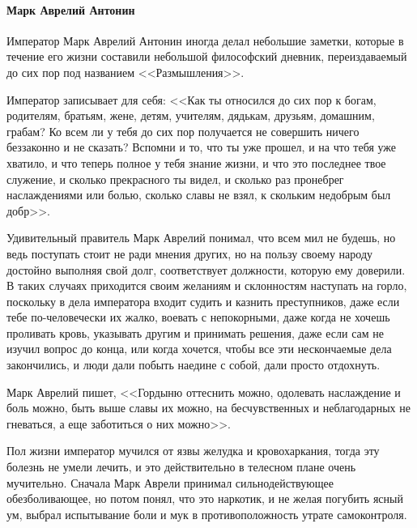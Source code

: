 \paragraph{Марк Аврелий Антонин}

Император Марк Аврелий Антонин иногда делал небольшие заметки, которые в течение его жизни составили небольшой философский дневник, переиздаваемый до сих пор под названием <<Размышления>>. 


Император записывает для себя: <<Как ты относился до сих пор к богам, родителям, братьям, жене, детям, учителям, дядькам, друзьям, домашним, грабам? Ко всем ли у тебя до сих пор получается не совершить ничего беззаконно и не сказать? Вспомни и то, что ты уже прошел, и на что тебя уже хватило, и что теперь полное у тебя знание жизни, и что это последнее твое служение, и сколько прекрасного ты видел, и сколько раз пронебрег наслаждениями или болью, сколько славы не взял, к скольким недобрым был добр>>. 

Удивительный правитель Марк Аврелий понимал, что всем мил не
будешь, но ведь поступать стоит не ради мнения других, но на пользу своему
народу достойно выполняя свой долг, соответствует должности, которую ему
доверили. В таких случаях приходится своим желаниям и склонностям наступать на
горло, поскольку в дела императора входит судить и казнить преступников, даже
если тебе по-человечески их жалко, воевать с непокорными, даже когда не хочешь
проливать кровь, указывать другим и принимать решения, даже если сам не изучил
вопрос до конца, или когда хочется, чтобы все эти нескончаемые дела закончились,
и люди дали побыть наедине с собой, дали просто отдохнуть. 

Марк Аврелий пишет,
<<Гордыню оттеснить можно, одолевать наслаждение и боль можно, быть выше славы их
можно, на бесчувственных и неблагодарных не гневаться, а еще заботиться о них
можно>>. 

Пол жизни император мучился от язвы желудка и кровохаркания, тогда эту
болезнь не умели лечить, и это действительно в телесном плане очень мучительно.
Сначала Марк Аврели принимал сильнодействующее обезболивающее, но потом понял,
что это наркотик, и не желая погубить ясный ум, выбрал испытывание боли и мук в
противоположность утрате самоконтроля. 

